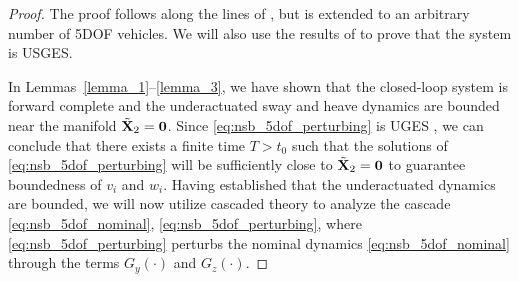 \begin{proof}
The proof follows along the lines of \cite{eek_formation_2021}, but is extended to an arbitrary number of 5DOF vehicles.
We will also use the results of \cite{pettersen_lyapunov_2017} to prove that the system is USGES.

In Lemmas~\ref{lemma_1}--\ref{lemma_3}, we have shown that the closed-loop system is forward complete and the underactuated sway and heave dynamics are bounded near the manifold $\tilde{\mathbf{X}}_2 = \mathbf{0}$.
Since \eqref{eq:nsb_5dof_perturbing} is UGES \cite{moe_LOS_2016}, we can conclude that there exists a finite time $T > t_0$ such that the solutions of \eqref{eq:nsb_5dof_perturbing} will be sufficiently close to $\tilde{\mathbf{X}}_2 = \mathbf{0}$ to guarantee boundedness of $v_i$ and $w_i$.
Having established that the underactuated dynamics are bounded, we will now utilize cascaded theory to analyze the cascade \eqref{eq:nsb_5dof_nominal}, \eqref{eq:nsb_5dof_perturbing}, where \eqref{eq:nsb_5dof_perturbing} perturbs the nominal dynamics \eqref{eq:nsb_5dof_nominal} through the terms $G_y(\cdot)$ and $G_z(\cdot)$.


\end{proof}
